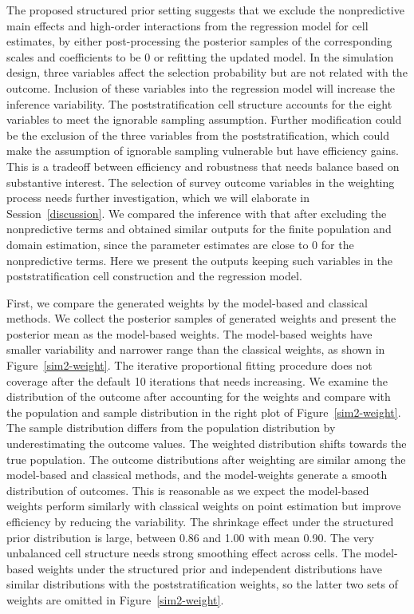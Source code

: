 \documentclass[11pt]{article}
\numberwithin{figure}{section}
\numberwithin{table}{section}
\numberwithin{equation}{section}
\begin{document}
The proposed structured prior setting suggests that we exclude the
nonpredictive main effects and high-order interactions from the regression
model for cell estimates, by either post-processing the posterior samples of
the corresponding scales and coefficients to be 0 or refitting the updated
model. In the simulation design, three variables affect the selection
probability but are not related with the outcome. Inclusion of these variables
into the regression model will increase the inference variability. The
poststratification cell structure accounts for the eight variables to meet the
ignorable sampling assumption. Further modification could be the exclusion of
the three variables from the poststratification, which could make the
assumption of ignorable sampling vulnerable but have efficiency gains. This is
a tradeoff between efficiency and robustness that needs balance based on
substantive interest. The selection of survey outcome variables in the
weighting process needs further investigation, which we will elaborate in
Session~\ref{discussion}. We compared the inference with that after excluding
the nonpredictive terms and obtained similar outputs for the finite population
and domain estimation, since the parameter estimates are close to 0 for the
nonpredictive terms. Here we present the outputs keeping such variables in the
poststratification cell construction and the regression model.

First, we compare the generated weights by the model-based and classical
methods. We collect the posterior samples of generated weights and present the
posterior mean as the model-based weights. The model-based weights have smaller
variability and narrower range than the classical weights, as shown in
Figure~\ref{sim2-weight}. The iterative proportional fitting procedure does not
coverage after the default 10 iterations that needs increasing. We examine the
distribution of the outcome after accounting for the weights and compare with
the population and sample distribution in the right plot of
Figure~\ref{sim2-weight}. The sample distribution differs from the population
distribution by underestimating the outcome values. The weighted distribution
shifts towards the true population. The outcome distributions after weighting
are similar among the model-based and classical methods, and the model-weights
generate a smooth distribution of outcomes. This is reasonable as we expect the
model-based weights perform similarly with classical weights on point
estimation but improve efficiency by reducing the variability. The shrinkage
effect under the structured prior distribution is large, between 0.86 and 1.00
with mean 0.90. The very unbalanced cell structure needs strong smoothing
effect across cells. The model-based weights under the structured prior and
independent distributions have similar distributions with the
poststratification weights, so the latter two sets of weights are omitted in
Figure~\ref{sim2-weight}. 
\end{document}
